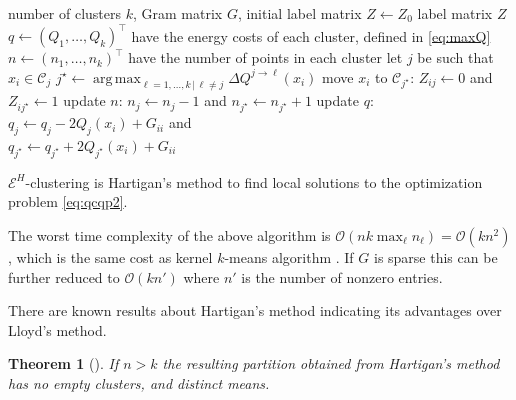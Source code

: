 \documentclass{article}
\newtheorem{theorem}{Theorem}
\DeclareMathOperator*{\argmax}{arg\,max}
\newcommand\C{{\mathcal{C}}}
\newcommand\OO{{\mathcal{O}}}
\begin{document}
\begin{algorithm}
\begin{algorithmic}[1]
    \INPUT number of clusters $k$, Gram matrix $G$, 
                initial label matrix $Z \leftarrow Z_0$
    \OUTPUT label matrix $Z$
  \STATE $q \leftarrow (Q_1, \dotsc, Q_k)^\top$ 
            have the energy costs of each cluster, defined in \eqref{eq:maxQ}
  \STATE $n \leftarrow (n_1,\dotsc,n_k)^\top$ have the number of points 
        in each cluster%
  \REPEAT
        \STATE let $j$ be such that $x_i \in \C_j$
        \STATE $j^\star \leftarrow \argmax_{\ell=1,\dotsc,k \, | \, \ell\ne j} 
                \Delta Q^{j\to \ell}(x_i)$
            \STATE move $x_i$ to $\C_{j^\star}$: $Z_{ij} \leftarrow 0$ and 
            $Z_{ij^\star} \leftarrow 1$
            \STATE update $n$: $n_j \leftarrow n_j - 1$ and
                    $n_{j^\star} \leftarrow n_{j^\star} + 1$
            \STATE update $q$: $q_j \leftarrow q_j - 2Q_j(x_i) + G_{ii}$ and \\
             \hspace{4.5em}$q_{j^\star} \leftarrow q_{j^\star} + 
                            2Q_{j^\star}(x_i)+ G_{ii}$
        \ENDIF
    \ENDFOR
\end{algorithmic}
\caption{\label{algo}
$\mathcal{E}^H$-clustering is Hartigan's method to find local solutions 
to the optimization problem \eqref{eq:qcqp2}.
}
\end{algorithm}

The worst time complexity of the above algorithm is
$\OO(n k  \max_\ell n_\ell) =\OO(k n^2)$, which
is the same cost as kernel $k$-means algorithm
\citep{Dhillon2,Dhillon}. 
If $G$ is sparse
this can be further reduced to $\OO(k n')$ where $n'$ is the number of 
nonzero entries.

There are known results about Hartigan's method
indicating its advantages over Lloyd's method.

\begin{theorem}[\citet{Telgarsky}]
If $n > k$ the resulting partition obtained from Hartigan's method has
no empty clusters, and distinct means.
\end{theorem}
\end{document}
